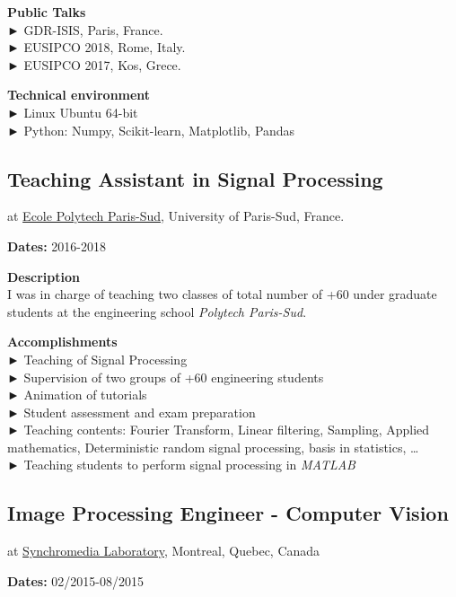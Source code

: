 \documentclass[
]{article}
\begin{document}
\textbf{Public Talks}\\
► GDR-ISIS, Paris, France.\\
► EUSIPCO 2018, Rome, Italy.\\
► EUSIPCO 2017, Kos, Grece.

\textbf{Technical environment}\\
► Linux Ubuntu 64-bit\\
► Python: Numpy, Scikit-learn, Matplotlib, Pandas

\hypertarget{teaching-assistant-in-signal-processing}{%
\subsection{Teaching Assistant in Signal
Processing}\label{teaching-assistant-in-signal-processing}}

at
\href{http://www.polytech.u-psud.fr/fr/formations/electronique-et-systemes-robotises.html}{Ecole
Polytech Paris-Sud}, University of Paris-Sud, France.

\textbf{Dates:} 2016-2018

\textbf{Description}\\
I was in charge of teaching two classes of total number of +60 under
graduate students at the engineering school \emph{Polytech Paris-Sud}.

\textbf{Accomplishments}\\
► Teaching of Signal Processing\\
► Supervision of two groups of +60 engineering students\\
► Animation of tutorials\\
► Student assessment and exam preparation\\
► Teaching contents: Fourier Transform, Linear filtering, Sampling,
Applied mathematics, Deterministic random signal processing, basis in
statistics, \ldots{}\\
► Teaching students to perform signal processing in \emph{MATLAB}

\hypertarget{image-processing-engineer---computer-vision}{%
\subsection{Image Processing Engineer - Computer
Vision}\label{image-processing-engineer---computer-vision}}

at \href{http://www.synchromedia.ca/}{Synchromedia Laboratory},
Montreal, Quebec, Canada

\textbf{Dates:} 02/2015-08/2015
\end{document}
